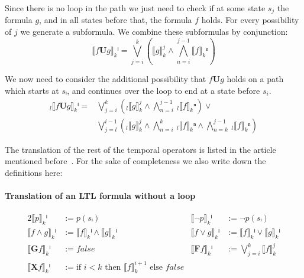 \documentclass[a4paper, 12pt]{article}
\begin{document}
\begin{description}[style=multiline, leftmargin=4cm]

    \item[Path without loop] Since there is no loop in the path we just need
    to check if at some state $s_j$ the formula $g$, and in all states before
    that, the formula $f$ holds. For every possibility of $j$ we generate a
    subformula. We combine these subformulas by conjunction:
    \[
        ⟦f\mathbf{U}g ⟧_kⁱ =
        ⋁_{j=i}^{k}\left(⟦g⟧_k^j ∧ ⋀_{n=i}^{j-1} ⟦f⟧_kⁿ\right)
    \]

    \item[Path with loop] We now need to consider the additional possibility
    that $f\mathbf{U}g$ holds on a path which starts at $sᵢ$, and continues
    over the loop to end at a state before $s_i$.
    \begin{align*}
        _l⟦ f\mathbf{U}g ⟧_kⁱ =
        & ⋁_{j=i}^{k}\left(_l⟦ g ⟧_k^j ∧ ⋀_{n=i}^{j-1} ~_l⟦ f ⟧_kⁿ\right) ∨\\
        & ⋁_{j=l}^{i-1}\left(
            _l⟦ g ⟧_k^j ∧
            ⋀_{n=i}^{k} ~_l⟦ f ⟧_kⁿ ∧
            ⋀_{n=k}^{j-1} ~_l⟦ f ⟧_kⁿ
        \right)
    \end{align*}

\end{description}

The translation of the rest of the temporal operators is listed in the article
mentioned before~\cite{Biere1999SymbolicModelChecking}. For the sake of
completeness we also write down the definitions here:

\paragraph{Translation of an LTL formula without a loop}
\begin{alignat*}{2}
    ⟦p⟧_kⁱ              &:= p(sᵢ)\quad\quad&
    ⟦¬p⟧_kⁱ             &:= ¬ p(sᵢ)\\
    ⟦f ∧ g⟧_kⁱ          &:= ⟦f⟧_kⁱ ∧ ⟦g⟧_kⁱ\quad\quad&
    ⟦f ∨ g⟧_kⁱ          &:= ⟦f⟧_kⁱ ∨ ⟦g⟧_kⁱ\\
    ⟦\mathbf{G} f⟧_kⁱ   &:= false\quad\quad&
    ⟦\mathbf{F} f⟧_kⁱ   &:= ⋁_{j=i}^k ⟦f⟧_k^{j}\\
    ⟦\mathbf{X} f⟧_kⁱ   &:= \text{if } i<k \text{ then } ⟦f⟧_k^{i+1}
                                           \text{ else } false
\end{alignat*}
\end{document}
